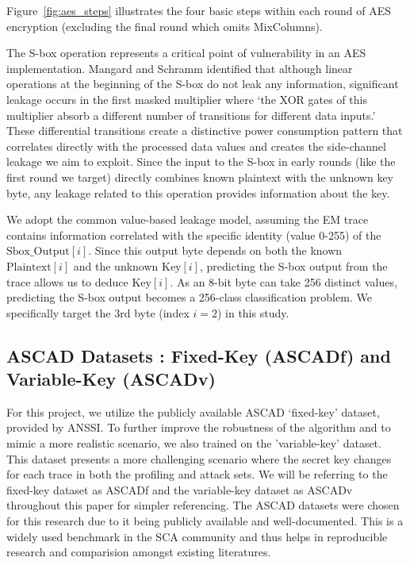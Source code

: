 \documentclass[runningheads]{llncs}
\begin{document}
Figure~\ref{fig:aes_steps} illustrates the four basic steps within each round of AES encryption (excluding the final round which omits MixColumns).

The S-box operation represents a critical point of vulnerability in an AES implementation. Mangard and Schramm identified that although linear operations at the beginning of the S-box do not leak any information, significant leakage occurs in the first masked multiplier where `the XOR gates of this multiplier absorb a different number of transitions for different data inputs.'\cite{mangard2006pinpointing} These differential transitions create a distinctive power consumption pattern that correlates directly with the processed data values and creates the side-channel leakage we aim to exploit. Since the input to the S-box in early rounds (like the first round we target) directly combines known plaintext with the unknown key byte, any leakage related to this operation provides information about the key. 

We adopt the common value-based leakage model, assuming the EM trace contains information correlated with the specific identity (value 0-255) of the $\text{Sbox\_Output}[i]$. Since this output byte depends on both the known $\text{Plaintext}[i]$ and the unknown $\text{Key}[i]$, predicting the S-box output from the trace allows us to deduce $\text{Key}[i]$. As an 8-bit byte can take 256 distinct values, predicting the S-box output becomes a 256-class classification problem. We specifically target the 3rd byte (index $i=2$) in this study.

\subsection{ASCAD Datasets : Fixed-Key (ASCADf) and Variable-Key (ASCADv)}
For this project, we utilize the publicly available ASCAD `fixed-key' dataset, provided by ANSSI.\cite{benadjila2020deep} To further improve the robustness of the algorithm and to mimic a more realistic scenario, we also trained on the 'variable-key' dataset. This dataset presents a more challenging scenario where the secret key changes for each trace in both the profiling and attack sets. We will be referring to the fixed-key dataset as ASCADf and the variable-key dataset as ASCADv throughout this paper for simpler referencing. The ASCAD datasets were chosen for this research due to it being publicly available and well-documented. This is a widely used benchmark in the SCA community and thus helps in reproducible research and comparision amongst existing literatures. 
\end{document}
